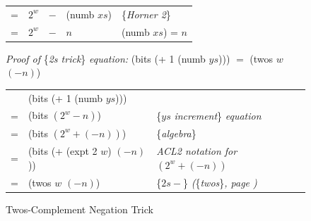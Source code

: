 \begin{figure}
\begin{center}
\begin{tabular} {lllll}
= & $2^w$ &$- $ &(numb $xs$)                                                   & \{\emph{Horner 2}\}   \\
= & $2^w$ &$- $ &$n$                                                           & (numb $xs$) = $n$     \\
\end{tabular}
\end{center}
\emph{Proof of} \{\emph{2s trick}\} \emph{equation:} (bits (+ 1 (numb $ys$))) $=$ (twos $w$ $(- n)$)
\begin{center}
\begin{tabular} {lll}
  & (bits (+ 1 (numb $ys$)))        & \\
= & (bits $(2^w - n)$)              & \{$ys$ \emph{increment}\} \emph{equation} \\
= & (bits $(2^w + (- n))$)          & \{\emph{algebra}\}                        \\
= & (bits (+ (expt 2 $w$) $(- n)$)) & \emph{ACL2 notation for} $(2^w + (- n))$\\
= & (twos $w$ $(- n)$)              & \{$2s-$\} \emph{(}\{\emph{twos}\}\emph{, page \pageref{twos-defun})} \\
\end{tabular}
\end{center}
\caption{Twos-Complement Negation Trick}
\label{fig:2s-comp-negation}
\end{figure}

